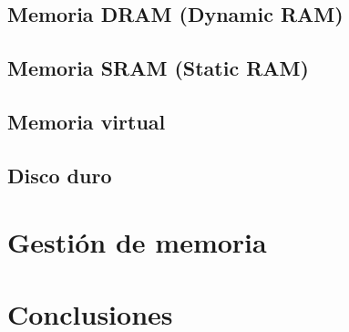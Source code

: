 \documentclass{article}
\begin{document}
\subsection{Memoria DRAM (Dynamic RAM)}
\subsection{Memoria SRAM (Static RAM)}
\subsection{Memoria virtual}
\subsection{Disco duro}


\section{Gestión de memoria}

\section{Conclusiones}




\end{document}
